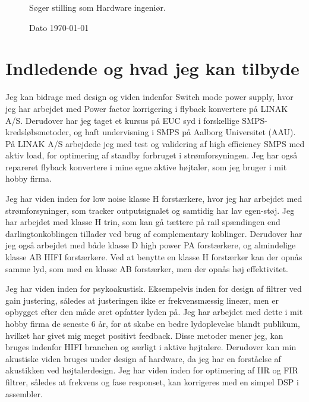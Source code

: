 \documentclass{my_application}
\begin{document}
%
\firstpagestyle{}
%
\begin{figure}[!ht]
\begin{minipage}[t][1 pt]{.69\textwidth}%
	\Large{Søger stilling som Hardware ingeniør.}
\end{minipage}
\hfill%
\begin{minipage}[t][1 pt][b]{.29\textwidth}
	\vfill
	\hfill Dato \today
\end{minipage}%
\end{figure}
%
\section{Indledende og hvad jeg kan tilbyde}
Jeg kan bidrage med design og viden indenfor Switch mode power supply, hvor jeg har arbejdet med Power factor korrigering i flyback konvertere på LINAK A/S. Derudover har jeg taget et kursus på EUC syd i forskellige SMPS-kredsløbsmetoder, og haft undervisning i SMPS på Aalborg Universitet (AAU). På LINAK A/S arbejdede jeg med test og validering af high efficiency SMPS med aktiv load, for optimering af standby forbruget i strømforsyningen. Jeg har også repareret flyback konvertere i mine egne aktive højtaler, som jeg bruger i mit hobby firma.

Jeg har viden inden for low noise klasse H forstærkere, hvor jeg har arbejdet med strømforsyninger, som tracker outputsignalet og samtidig har lav egen-støj. Jeg har arbejdet med klasse H trin, som kan gå tættere på rail spændingen end darlingtonkoblingen tillader ved brug af complementary koblinger. Derudover har jeg også arbejdet med både klasse D high power PA forstærkere, og almindelige klasse AB HIFI forstærkere. Ved at benytte en klasse H forstærker kan der opnås samme lyd, som med en klasse AB forstærker, men der opnås høj effektivitet. 

Jeg har viden inden for psykoakustisk. Eksempelvis inden for design af filtrer ved gain justering, således at justeringen ikke er frekvensmæssig lineær, men er opbygget efter den måde øret opfatter lyden på. Jeg har arbejdet med dette i mit hobby firma de seneste 6 år, for at skabe en bedre lydoplevelse blandt publikum, hvilket har givet mig meget positivt feedback. Disse metoder mener jeg, kan bruges indenfor HIFI branchen og særligt i aktive højtalere. Derudover kan min akustiske viden bruges under design af hardware, da jeg har en forståelse af akustikken ved højtalerdesign. Jeg har viden inden for optimering af IIR og FIR filtrer, således at frekvens og fase responset, kan korrigeres med en simpel DSP i assembler. 
\end{document}
